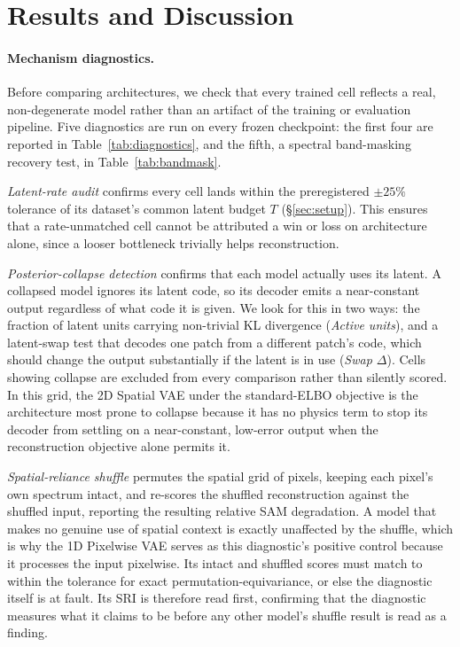 \documentclass[twoside,11pt]{article}
\begin{document}
\section{Results and Discussion}
\label{sec:results}


\paragraph{Mechanism diagnostics.}
Before comparing architectures, we check that every trained cell reflects a real, non-degenerate model rather than an artifact of the training or evaluation pipeline. Five diagnostics are run on every frozen checkpoint: the first four are reported in Table~\ref{tab:diagnostics}, and the fifth, a spectral band-masking recovery test, in Table~\ref{tab:bandmask}.

\emph{Latent-rate audit} confirms every cell lands within the preregistered $\pm25\%$ tolerance of its dataset's common latent budget $T$ (\S\ref{sec:setup}). This ensures that a rate-unmatched cell cannot be attributed a win or loss on architecture alone, since a looser bottleneck trivially helps reconstruction.

\emph{Posterior-collapse detection} confirms that each model actually uses its latent. A collapsed model ignores its latent code, so its decoder emits a near-constant output regardless of what code it is given. We look for this in two ways: the fraction of latent units carrying non-trivial KL divergence (\emph{Active units}), and a latent-swap test that decodes one patch from a different patch's code, which should change the output substantially if the latent is in use (\emph{Swap $\Delta$}). Cells showing collapse are excluded from every comparison rather than silently scored. In this grid, the 2D Spatial VAE under the standard-ELBO objective is the architecture most prone to collapse because it has no physics term to stop its decoder from settling on a near-constant, low-error output when the reconstruction objective alone permits it.

\emph{Spatial-reliance shuffle} permutes the spatial grid of pixels, keeping each pixel's own spectrum intact, and re-scores the shuffled reconstruction against the shuffled input, reporting the resulting relative SAM degradation. A model that makes no genuine use of spatial context is exactly unaffected by the shuffle, which is why the 1D Pixelwise VAE serves as this diagnostic's positive control because it processes the input pixelwise. Its intact and shuffled scores must match to within the tolerance for exact permutation-equivariance, or else the diagnostic itself is at fault. Its SRI is therefore read first, confirming that the diagnostic measures what it claims to be before any other model's shuffle result is read as a finding.
\end{document}
